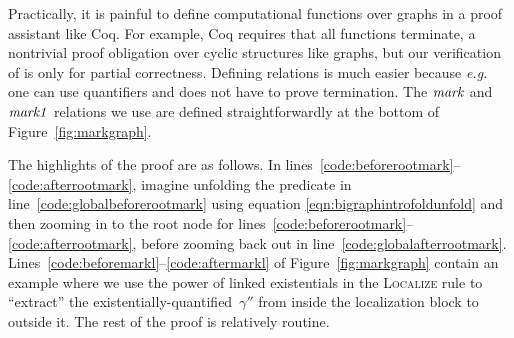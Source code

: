 Practically, it is painful to define computational functions over graphs in a proof assistant like Coq.  For example, Coq requires that all functions terminate, a nontrivial proof obligation over cyclic structures like graphs, but our verification of  is only for partial correctness.  Defining relations is much easier because \emph{e.g.} one can use quantifiers and does not have to prove termination.
The $\mathit{mark}$ and $\mathit{mark1}$ relations we use are defined straightforwardly at the bottom of Figure~\ref{fig:markgraph}.

The highlights of the proof are as follows.
In lines~\ref{code:beforerootmark}--\ref{code:afterrootmark}, imagine unfolding the  predicate in line~\ref{code:globalbeforerootmark} using equation \ref{eqn:bigraphintrofoldunfold} and then zooming in to the root node  for lines~\ref{code:beforerootmark}--\ref{code:afterrootmark}, before zooming back out in line~\ref{code:globalafterrootmark}.
Lines~\ref{code:beforemarkl}--\ref{code:aftermarkl} of Figure~\ref{fig:markgraph} contain an example where we use the power of linked existentials in the \textsc{Localize} rule to ``extract'' the existentially-quantified~$\gamma''$ from inside the localization block to outside it.
The rest of the proof is relatively routine.


